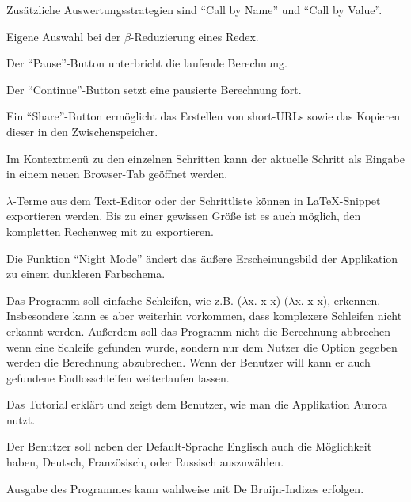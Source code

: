 \documentclass[parskip=full,11pt,twoside]{scrartcl}
\begin{document}
Zusätzliche Auswertungsstrategien sind \enquote{Call by Name} und \enquote{Call by Value}.

Eigene Auswahl bei der $\beta$-Reduzierung eines Redex.

Der \enquote{Pause}-Button unterbricht die laufende Berechnung.

Der \enquote{Continue}-Button setzt eine pausierte Berechnung fort.

Ein \enquote{Share}-Button ermöglicht das Erstellen von short-URLs sowie das Kopieren dieser in den Zwischenspeicher.

Im Kontextmenü zu den einzelnen Schritten kann der aktuelle Schritt als Eingabe in einem neuen Browser-Tab geöffnet werden.

$\lambda$-Terme aus dem Text-Editor oder der Schrittliste können in LaTeX-Snippet exportieren werden. Bis zu einer gewissen Größe ist es auch möglich, den kompletten Rechenweg mit zu exportieren.

Die Funktion \enquote{Night Mode} ändert das äußere Erscheinungsbild der Applikation zu einem dunkleren Farbschema.

Das Programm soll einfache Schleifen, wie z.B. ($\lambda$x. x x) ($\lambda$x. x x), erkennen. Insbesondere kann es aber weiterhin vorkommen, dass komplexere Schleifen nicht erkannt werden.
Außerdem soll das Programm nicht die Berechnung abbrechen wenn eine Schleife gefunden wurde, sondern nur dem Nutzer die Option gegeben werden die Berechnung abzubrechen. Wenn der Benutzer  will kann er auch gefundene Endlosschleifen weiterlaufen lassen.

Das Tutorial erklärt und zeigt dem Benutzer, wie man die Applikation Aurora nutzt.

Der Benutzer soll neben der Default-Sprache Englisch auch die Möglichkeit haben, Deutsch, Französisch, oder Russisch auszuwählen.

Ausgabe des Programmes kann wahlweise mit De Bruijn-Indizes erfolgen.
\end{document}
